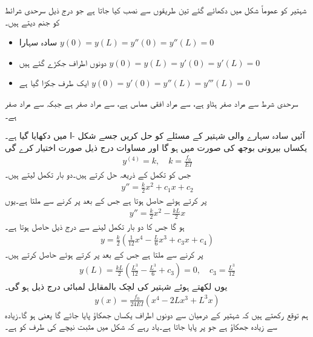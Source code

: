شہتیر کو عموماً شکل  میں دکھائے گئے تین طریقوں سے  نصب کیا جاتا ہے جو درج ذیل سرحدی شرائط کو جنم دیتے ہیں۔
\begin{itemize}
\item[(ا)]\quad سادہ سہارا \quad
$y(0)=y(L)=y''(0)=y''(L)=0$
\item[(ب)]\quad دونوں اطراف جکڑے گئے ہیں \quad 
$y(0)=y(L)=y'(0)=y'(L)=0$
\item[(ج)]\quad ایک طرف جکڑا گیا ہے \quad
$y(0)=y'(0)=y''(L)=y'''(L)=0$
\end{itemize}
سرحدی  شرط  سے مراد صفر ہٹاو ہے،  سے مراد افقی مماس ہے،  سے مراد صفر   ہے جبکہ  سے مراد صفر  ہے۔

آئیں سادہ سہارے والی شہتیر کے مسئلے کو حل کریں جسے شکل -ا میں دکھایا گیا ہے۔یکساں بیرونی بوجھ کی صورت میں  ہو گا اور مساوات  درج ذیل صورت اختیار کرے گی
\begin{align}
y^{(4)}=k, \quad k=\frac{f_0}{EI}
\end{align}
جس کو تکمل کے ذریعہ حل کرتے ہیں۔دو بار تکمل لیتے ہیں۔
\begin{align*}
y''=\frac{k}{2}x^2+c_1x+c_2
\end{align*}
 پر کرتے ہوئے  حاصل ہوتا ہے جس کے بعد   پر کرنے سے  ملتا ہے۔یوں
\begin{align*}
y''=\frac{k}{2}x^2-\frac{kL}{2}x
\end{align*}
ہو گا جس کا دو بار تکمل لینے سے درج ذیل حاصل ہوتا ہے۔
\begin{align*}
y=\frac{k}{2}\left(\frac{1}{12}x^4-\frac{L}{6}x^3+c_3x+c_4\right)
\end{align*}
 پر کرنے سے  ملتا ہے جس کے بعد  پر کرتے ہوئے  حاصل کرتے ہیں۔
\begin{align*}
y(L)=\frac{kL}{2}\left(\frac{L^3}{12}-\frac{L^3}{6}+c_3\right)=0, \quad c_3=\frac{L^3}{12}
\end{align*}
یوں  لکھتے ہوئے شہتیر کی لچک بالمقابل لمبائی درج ذیل ہو گی۔
\begin{align*}
y(x)=\frac{f_0}{24EI}(x^4-2Lx^3+L^3x)
\end{align*}
ہم توقع رکھتے ہیں کہ شہتیر کے درمیان سے دونوں اطراف یکساں جھکاؤ پایا جائے گا یعنی  ہو گا۔زیادہ سے زیادہ جھکاؤ  ہے جو  پر پایا جاتا ہے۔یاد رہے کہ شکل  میں مثبت  نیچے کی طرف کو ہے۔

